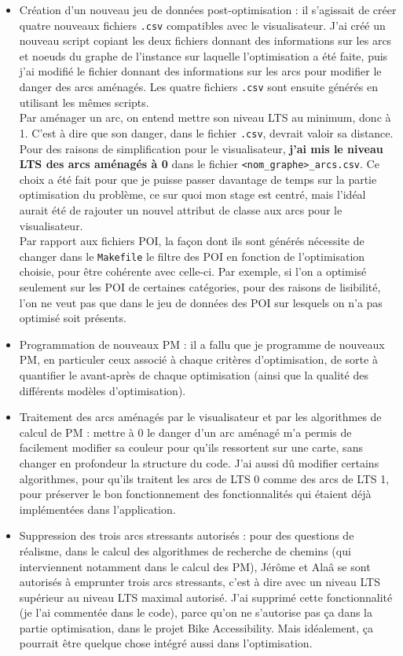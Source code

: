 \begin{itemize}
    \item Création d'un nouveau jeu de données post-optimisation : il s'agissait de créer quatre nouveaux fichiers \verb|.csv| compatibles avec le visualisateur. J'ai créé un nouveau script copiant les deux fichiers donnant des informations sur les arcs et noeuds du graphe de l'instance sur laquelle l'optimisation a été faite, puis j'ai modifié le fichier donnant des informations sur les arcs pour modifier le danger des arcs aménagés. Les quatre fichiers \verb|.csv| sont ensuite générés en utilisant les mêmes scripts.
    \\
    Par aménager un arc, on entend mettre son niveau LTS au minimum, donc à 1. C'est à dire que son danger, dans le fichier \verb|.csv|, devrait valoir sa distance. Pour des raisons de simplification pour le visualisateur, \textbf{j'ai mis le niveau LTS des arcs aménagés à 0} dans le fichier \verb|<nom_graphe>_arcs.csv|. Ce choix a été fait pour que je puisse passer davantage de temps sur la partie optimisation du problème, ce sur quoi mon stage est centré, mais l'idéal aurait été de rajouter un nouvel attribut de classe aux arcs pour le visualisateur.
    \\
    Par rapport aux fichiers POI, la façon dont ils sont générés nécessite de changer dans le \verb|Makefile| le filtre des POI en fonction de l'optimisation choisie, pour être cohérente avec celle-ci. Par exemple, si l'on a optimisé seulement sur les POI de certaines catégories, pour des raisons de lisibilité, l'on ne veut pas que dans le jeu de données des POI sur lesquels on n'a pas optimisé soit présents.
    \item Programmation de nouveaux PM : il a fallu que je programme de nouveaux PM, en particuler ceux associé à chaque critères d'optimisation, de sorte à quantifier le avant-après de chaque optimisation (ainsi que la qualité des différents modèles d'optimisation). 
    \item Traitement des arcs aménagés par le visualisateur et par les algorithmes de calcul de PM : mettre à 0 le danger d'un arc aménagé m'a permis de facilement modifier sa couleur pour qu'ils ressortent sur une carte, sans changer en profondeur la structure du code. J'ai aussi dû modifier certains algorithmes, pour qu'ils traitent les arcs de LTS 0 comme des arcs de LTS 1, pour préserver le bon fonctionnement des fonctionnalités qui étaient déjà implémentées dans l'application.
    \item Suppression des trois arcs stressants autorisés : pour des questions de réalisme, dans le calcul des algorithmes de recherche de chemins (qui interviennent notamment dans le calcul des PM), Jérôme et Alaâ se sont autorisés à emprunter trois arcs stressants, c'est à dire avec un niveau LTS supérieur au niveau LTS maximal autorisé. J'ai supprimé cette fonctionnalité (je l'ai commentée dans le code), parce qu'on ne s'autorise pas ça dans la partie optimisation, dans le projet Bike Accessibility. Mais idéalement, ça pourrait être quelque chose intégré aussi dans l'optimisation.

\end{itemize}
